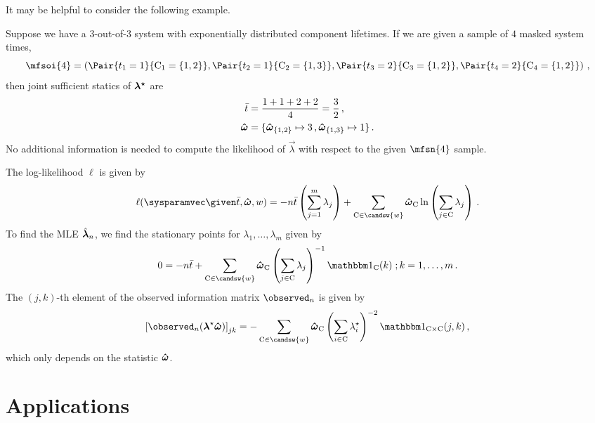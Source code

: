 \documentclass[../main.tex]{subfiles}
\begin{document}
It may be helpful to consider the following example.
\begin{example}
Suppose we have a $3$-out-of-$3$ system with exponentially distributed component lifetimes.
If we are given a sample of $4$ masked system times,
\begin{equation}
    \mfsoi{4} = \left(
        \Pair{t_1 = 1}{\cand_1 = \{ 1, 2 \}},
        \Pair{t_2 = 1}{\cand_2 = \{ 1, 3 \}},
        \Pair{t_3 = 2}{\cand_3 = \{ 1, 2 \}},
        \Pair{t_4 = 2}{\cand_4 = \{ 1, 2 \}}
    \right)\,,
\end{equation}
then joint sufficient statics of $\boldsymbol{{\lambda}^{\star}}$ are
\begin{align*}
    \bar t &= \frac{1 + 1 + 2 + 2}{4} = \frac{3}{2}\,,\\
    \boldsymbol{\hat\omega} &= \{\boldsymbol{\hat\omega}_{\{1,2\}} \mapsto 3\,,\boldsymbol{\hat\omega}_{\{1,3\}} \mapsto 1\}\,.
\end{align*}
No additional information is needed to compute the likelihood of $\vec\lambda$ with respect to the given $\mfsn{4}$ sample.
\end{example}

The log-likelihood $\ell$ is given by
\begin{equation}
\ell(\sysparamvec \given \bar t, \vec\cntsymb, w) =
    -n \bar t \left ( \sum_{j=1}^{m} \lambda_j \right ) +
    \sum_{\cand \in \candsw{w}} \cntsymb_{\cand} \ln
        \left ( \sum_{j \in \cand} \lambda_j \right )\,.
\end{equation}
To find the MLE $\hat{\boldsymbol{\lambda}}_n$, we find the stationary points for $\lambda_1, \ldots, \lambda_m$ given by
\begin{equation}
    0   =  -n \bar t +
            \sum_{\cand \in \candsw{w}} \cntsymb_{\cand}
                \left (
                    \sum_{j \in \cand} \lambda_j
                \right )^{-1} \SetIndicator{\cand}(k)\;; k = 1, \ldots, m\,.
\end{equation}
The $(j, k)$-th element of the observed information matrix $\observed_n$ is given by
\begin{equation}
    \left [ \observed_n(\tparam{\vec\lambda} \vec\cntsymb) \right ]_{j k} =
        - \sum_{\cand \in \candsw{w}} \cntsymb_{\cand} \left( \sum_{i \in \cand} \tparam\lambda_i \right)^{-2} \SetIndicator{\cand \times \cand}(j,k)\,,
\end{equation}
which only depends on the statistic $\boldsymbol{\hat\omega}$.

\section{Applications}
\end{document}
